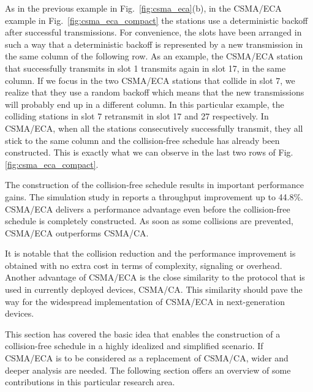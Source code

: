 \documentclass[journal]{IEEEtran}
\begin{document}
As in the previous example in Fig.~\ref{fig:csma_eca}(b), in the CSMA/ECA example in Fig.~\ref{fig:csma_eca_compact} the stations use a deterministic backoff after successful transmissions.
For convenience, the slots have been arranged in such a way that a deterministic backoff is represented by a new transmission in the same column of the following row.
As an example, the CSMA/ECA station that successfully transmits in slot 1 transmits again in slot 17, in the same column.
If we focus in the two CSMA/ECA stations that collide in slot 7, we realize that they use a random backoff which means that the new transmissions will probably end up in a different column.
In this particular example, the colliding stations in slot 7 retransmit in slot 17 and 27 respectively.
In CSMA/ECA, when all the stations consecutively successfully transmit, they all stick to the same column and the collision-free schedule has already been constructed.
This is exactly what we can observe in the last two rows of Fig. \ref{fig:csma_eca_compact}.

The construction of the collision-free schedule results in important performance gains.
The simulation study in \cite{he2009srb} reports a throughput improvement up to 44.8\%.
CSMA/ECA delivers a performance advantage even before the collision-free schedule is completely constructed.
As soon as some collisions are prevented, CSMA/ECA outperforms CSMA/CA.

It is notable that the collision reduction and the performance improvement is obtained with no extra cost in terms of complexity, signaling or overhead.
Another advantage of CSMA/ECA is the close similarity to the protocol that is used in currently deployed devices, CSMA/CA.
This similarity should pave the way for the widespread implementation of CSMA/ECA in next-generation devices.

This section has covered the basic idea that enables the construction of a collision-free schedule in a highly idealized and simplified scenario. If CSMA/ECA is to be considered as a replacement of CSMA/CA, wider and deeper analysis are needed. The following section offers an overview of some contributions in this particular research area.
\end{document}
